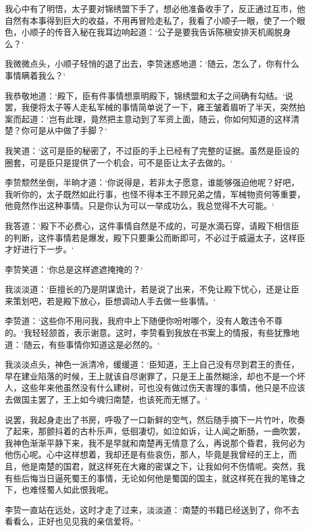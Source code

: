 我心中有了明悟，太子要对锦绣盟下手了，想必他准备收手了，反正通过互市，他自然有本事得到巨大的收益，不用再冒险走私了，我看了小顺子一眼，使了一个眼色，小顺子的传音入秘在我耳边响起道：‘公子是要我告诉陈稹安排天机阁脱身么？‘

我微微点头，小顺子轻悄的退了出去，李贽迷惑地道：‘随云，怎么了，你有什么事情瞒着我么？‘

我恭敬地道：‘殿下，臣有件事情想禀明殿下，锦绣盟和太子之间确有勾结。‘说罢，我便将太子等人走私军械的事情简单说了一下，雍王皱着眉听了半天，突然拍案而起道：‘岂有此理，竟然把主意动到了军资上面，随云，你如何知道的这样清楚？你可是从中做了手脚？‘

我笑道：‘这可是臣的秘密了，不过臣的手上已经有了完整的证据。虽然是臣设的圈套，可是臣只是提供了一个机会，可不是臣让太子去做的。‘

李贽颓然坐倒，半晌才道：‘你说得是，若非太子愿意，谁能够强迫他呢？好吧，我听你的，太子既然如此行事，也怪不得本王不顾兄弟之情，军械物资何等重要，他竟然作出这种事情。只是你认为可以一举成功么，我总觉得不大可能。‘

我答道：‘殿下不必费心，这件事情自然是不成的，可是水滴石穿，请殿下相信臣的判断，这件事情若是爆发，殿下只要秉公而断即可，不必过于威逼太子，这样臣才好进行下一步。‘

李贽笑道：‘你总是这样遮遮掩掩的？‘

我淡淡道：‘臣擅长的乃是阴谋诡计，若是说了出来，不免让殿下忧心，还是让臣来策划吧，若是殿下放心，臣想调动人手去做一些事情。‘

李贽道：‘这些你不用问我，我府中上下随便你吩咐哪个，没有人敢违令不尊的。‘我轻轻颔首，表示谢意。这时，李贽看到我放在书案上的情报，有些犹豫地道：‘随云，有些事情你知道这是必然的。‘

我淡淡点头，神色一派清冷，缓缓道：‘臣知道，王上自己没有尽到君王的责任，早在建业陷落的时候，王上就该自尽谢罪了，只是王上虽然糊涂，却也不是一个坏人，这些年来他虽然没有什么建树，可也没有做过伤天害理的事情，他只是不应该去做国主罢了，王上如今魂归南楚，也该死而无憾了。‘

说罢，我起身走出了书房，呼吸了一口新鲜的空气，然后随手摘下一片竹叶，吹奏了起来，那颤抖着的古朴乐声，低徊凄切，如泣如诉，让人闻之断肠，一曲吹罢，我神色渐渐平静下来，我不是早就和南楚再无情意了么，再说那个昏君，我何必为他伤心呢。心中这样想着，我却还是有些哀伤，那人，毕竟是我曾经的王上，而且，他是南楚的国君，就这样死在大雍的密谋之下，让我如何不伤情呢。突然，我有些后悔当日逼死蜀王的事情，无论如何他是蜀国的国主，就这样死在我的笔锋之下，也难怪蜀人如此恨我呢。

李贽一直站在远处，这时才走了过来，淡淡道：‘南楚的书籍已经送到了，你不去看看么，正好也见见我的亲信爱将。‘

